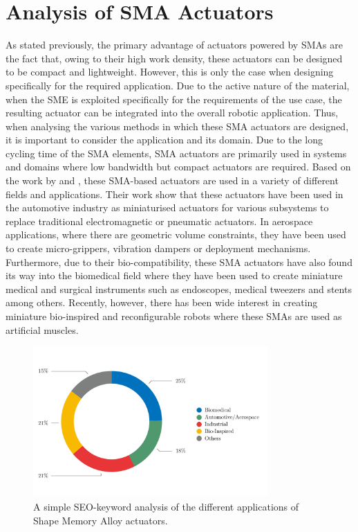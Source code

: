 \section{Analysis of SMA Actuators}
As stated previously, the primary advantage of actuators powered by SMAs are the fact that, owing to their high work density, these actuators can be designed to be compact and lightweight. However, this is only the case when designing specifically for the required application. Due to the active nature of the material, when the SME is exploited specifically for the requirements of the use case, the resulting actuator can be integrated into the overall robotic application. Thus, when analysing the various methods in which these SMA actuators are designed, it is important to consider the application and its domain. Due to the long cycling time of the SMA elements, SMA actuators are primarily used in systems and domains where low bandwidth but compact actuators are required. Based on the work by \cite{mohdjaniReviewShapeMemory2014} and \cite{sreekumarCriticalReviewCurrent2007}, these SMA-based actuators are used in a variety of different fields and applications. Their work show that these actuators have been used in the automotive industry as miniaturised actuators for various subsystems to replace traditional electromagnetic or pneumatic actuators. In aerospace applications, where there are geometric volume constraints, they have been used to create micro-grippers, vibration dampers or deployment mechanisms. Furthermore, due to their bio-compatibility, these SMA actuators have also found its way into the biomedical field where they have been used to create miniature medical and surgical instruments such as endoscopes, medical tweezers and stents among others. Recently, however, there has been wide interest in creating miniature bio-inspired and reconfigurable robots where these SMAs are used as artificial muscles.

\begin{figure}[hbt!]
    \centering
    \includegraphics[width=0.8\textwidth]{images/chap1/domain-donut-chart.pdf}
    \caption{A simple SEO-keyword analysis of the different applications of Shape Memory Alloy actuators.}
    \label{fig:domain-donut-chart}
\end{figure}

